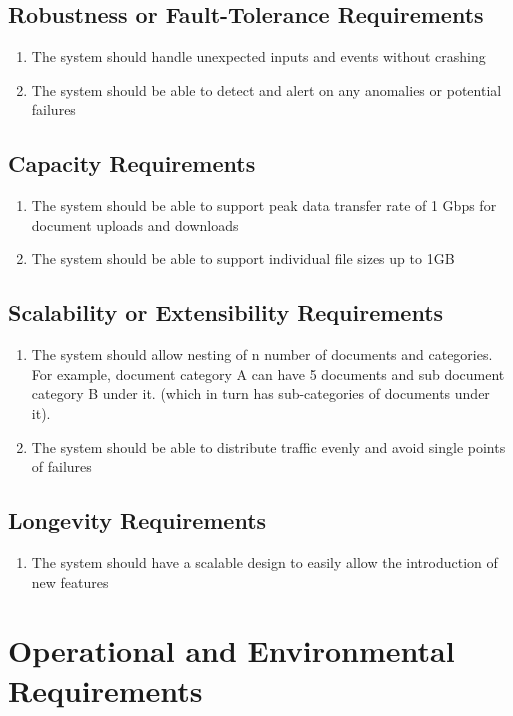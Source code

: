 \documentclass[12pt]{article}
\begin{document}
\subsection{Robustness or Fault-Tolerance Requirements}
\begin{enumerate}[{PR-RFT}1.]
  \item The system should handle unexpected inputs and events without crashing
  \item The system should be able to detect and alert on any
    anomalies or potential failures
\end{enumerate}

\subsection{Capacity Requirements}
\begin{enumerate}[{PR-CR}1.]
  \item The system should be able to support peak data transfer rate
    of 1 Gbps for document uploads and downloads
  \item The system should be able to support individual file sizes up to 1GB
\end{enumerate}

\subsection{Scalability or Extensibility Requirements}
\begin{enumerate}[{PR-SE}1.]
  \item The system should allow nesting of n number of documents and
    categories. For example, document category A can have 5 documents
    and sub document category B under it. (which in turn has
    sub-categories of documents under it).
  \item The system should be able to distribute traffic evenly and
    avoid single points of failures
\end{enumerate}

\subsection{Longevity Requirements}
\begin{enumerate}[{PR-LR}1.]
  \item The system should have a scalable design to easily allow the
    introduction of new features
\end{enumerate}

\newpage{}
\section{Operational and Environmental Requirements}
\end{document}
